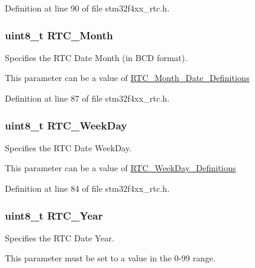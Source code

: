 Definition at line 90 of file stm32f4xx\-\_\-rtc.\-h.

\hypertarget{struct_r_t_c___date_type_def_a8f0d023494a7f66ec535d97b14d34363}{
\subsubsection[{R\-T\-C\-\_\-\-Month}]{\setlength{\rightskip}{0pt plus 5cm}uint8\-\_\-t R\-T\-C\-\_\-\-Month}}\label{struct_r_t_c___date_type_def_a8f0d023494a7f66ec535d97b14d34363}
\begin{DoxyVerb}Specifies the RTC Date Month (in BCD format).
\end{DoxyVerb}
 This parameter can be a value of \hyperlink{group___r_t_c___month___date___definitions}{R\-T\-C\-\_\-\-Month\-\_\-\-Date\-\_\-\-Definitions} 

Definition at line 87 of file stm32f4xx\-\_\-rtc.\-h.

\hypertarget{struct_r_t_c___date_type_def_a11187916c6ecdc5464df15561f9f67f8}{
\subsubsection[{R\-T\-C\-\_\-\-Week\-Day}]{\setlength{\rightskip}{0pt plus 5cm}uint8\-\_\-t R\-T\-C\-\_\-\-Week\-Day}}\label{struct_r_t_c___date_type_def_a11187916c6ecdc5464df15561f9f67f8}
\begin{DoxyVerb}Specifies the RTC Date WeekDay.
\end{DoxyVerb}
 This parameter can be a value of \hyperlink{group___r_t_c___week_day___definitions}{R\-T\-C\-\_\-\-Week\-Day\-\_\-\-Definitions} 

Definition at line 84 of file stm32f4xx\-\_\-rtc.\-h.

\hypertarget{struct_r_t_c___date_type_def_a1dee45ae66ca3892b6a1fdc78d12cc27}{
\subsubsection[{R\-T\-C\-\_\-\-Year}]{\setlength{\rightskip}{0pt plus 5cm}uint8\-\_\-t R\-T\-C\-\_\-\-Year}}\label{struct_r_t_c___date_type_def_a1dee45ae66ca3892b6a1fdc78d12cc27}
\begin{DoxyVerb} Specifies the RTC Date Year.
\end{DoxyVerb}
 This parameter must be set to a value in the 0-\/99 range. 

